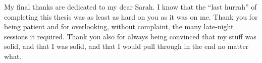 	My final thanks are dedicated to my dear Sarah. I know that the ``last hurrah'' of completing this thesis was as least as hard on you as it was on me. Thank you for being patient and for overlooking, without complaint, the many late-night sessions it required. Thank you also for always being convinced that my stuff was solid, and that I was solid, and that I would pull through in the end no matter what.










	\vfill
